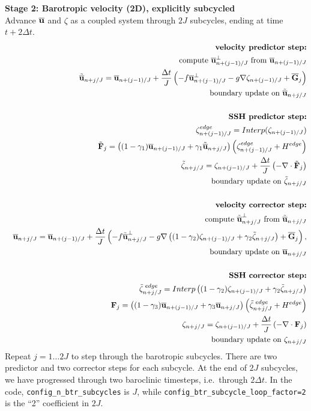 \documentclass[11pt]{report}
\newcommand{\nn}{\nonumber}
\begin{document}
\newpage
{\bf Stage 2: Barotropic velocity (2D), explicitly subcycled}\\
Advance $\overline{\bf u}$ and $\zeta$ as a coupled system through $2J$ subcycles, ending at time $t+2\Delta t$. 
\begin{eqnarray}   
\label{u btr 5} &&
\mbox{{\bf velocity predictor step:}} \nn \\ &&
\mbox{compute }\ubtr_{n+(j-1)/J}^{\perp}\mbox{ from }\ubtr_{n+(j-1)/J} \\ && 
{\tilde \ubtr}_{n+j/J} = \ubtr_{n+(j-1)/J} + \frac{\Delta t}{J} \left(
- f\ubtr_{n+(j-1)/J}^{\perp}
- g\nabla \zeta_{n+(j-1)/J} + {\overline {\bf G}_j}
\right)\\ &&
\mbox{boundary update on }{\tilde \ubtr}_{n+j/J}\\ && 
\nn \\ &&
\mbox{{\bf SSH predictor step:}}\nn \\ &&
\zeta_{n+(j-1)/J}^{edge} = Interp(\zeta_{n+(j-1)/J}) \\ &&
\tilde{\bf F}_j = \left((1-\gamma_1){\ubtr}_{n+(j-1)/J}  + \gamma_1{\tilde \ubtr}_{n+j/J}\right)
\left(\zeta_{n+(j-1)/J}^{edge} + H^{edge} \right)\\ &&
\tilde\zeta_{n+j/J} = \zeta_{n+(j-1)/J} + \frac{\Delta t}{J} \left( -
 \nabla \cdot \tilde{\bf F}_j \right) \\ &&
\mbox{boundary update on } \tilde\zeta_{n+j/J} \\ && 
\nn \\ &&
\mbox{{\bf velocity corrector step:}}\nn \\ &&
\mbox{compute }{\tilde \ubtr}_{n+j/J}^{\perp}\mbox{ from }{\tilde \ubtr}_{n+j/J} \\ && 
\ubtr_{n+j/J} = \ubtr_{n+(j-1)/J} + \frac{\Delta t}{J} \left(
- f{\tilde \ubtr}_{n+j/J}^{\perp}
- g\nabla \left((1-\gamma_2)\zeta_{n+(j-1)/J} + \gamma_2\tilde\zeta_{n+j/J}\right) + {\overline {\bf G}_j}
\right),\\ &&
\mbox{boundary update on }\ubtr_{n+j/J}\\ && 
\nn\\ &&
\mbox{{\bf SSH corrector step:}}\nn \\ &&
\tilde\zeta_{n+j/J}^{\;edge}= Interp\left((1-\gamma_2)\zeta_{n+(j-1)/J} + \gamma_2\tilde\zeta_{n+j/J}\right) \\&&
{\bf F}_j = \left((1-\gamma_3){\ubtr}_{n+(j-1)/J}  + \gamma_3 \ubtr_{n+j/J}\right)
\left(\tilde\zeta_{n+j/J}^{\;edge} + H^{edge} \right)\\ &&
\zeta_{n+j/J} = \zeta_{n+(j-1)/J} + \frac{\Delta t}{J} \left( -
 \nabla \cdot {\bf F}_j \right) \\ &&
\mbox{boundary update on } \zeta_{n+j/J} 
\end{eqnarray}   
Repeat $j=1\ldots 2J$ to step through the barotropic subcycles.  There are two predictor and two corrector steps for each subcycle.  At the end of $2J$ subcycles, we have progressed through two baroclinic timesteps, i.e.\ through $2\Delta t$.  In the code, {\tt config\_n\_btr\_subcycles} is $J$, while {\tt config\_btr\_subcycle\_loop\_factor=2} is the ``2'' coefficient in $2J$.  
\end{document}
